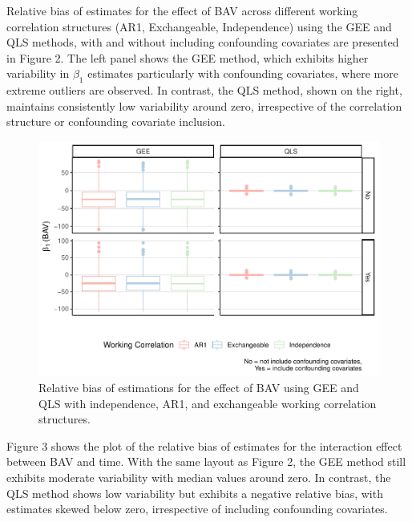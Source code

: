 \documentclass[
]{aft}
\begin{document}
Relative bias of estimates for the effect of BAV across different
working correlation structures (AR1, Exchangeable, Independence) using
the GEE and QLS methods, with and without including confounding
covariates are presented in Figure 2. The left panel shows the GEE
method, which exhibits higher variability in \(\beta_1\) estimates
particularly with confounding covariates, where more extreme outliers
are observed. In contrast, the QLS method, shown on the right, maintains
consistently low variability around zero, irrespective of the
correlation structure or confounding covariate inclusion.

\begin{figure}[H]

{\centering \includegraphics{FinalReport_files/figure-pdf/unnamed-chunk-4-1.pdf}

}

\caption{Relative bias of estimations for the effect of BAV using GEE
and QLS with independence, AR1, and exchangeable working correlation
structures.}

\end{figure}%

Figure 3 shows the plot of the relative bias of estimates for the
interaction effect between BAV and time. With the same layout as Figure
2, the GEE method still exhibits moderate variability with median values
around zero. In contrast, the QLS method shows low variability but
exhibits a negative relative bias, with estimates skewed below zero,
irrespective of including confounding covariates.
\end{document}
